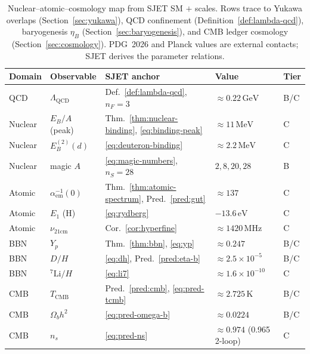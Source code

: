 \begin{table}[ht]
\centering
\small
\renewcommand{\arraystretch}{1.14}
\begin{tabular}{@{}lllll@{}}
\toprule
\textbf{Domain} & \textbf{Observable} & \textbf{SJET anchor} &
\textbf{Value} & \textbf{Tier} \\
\midrule
QCD &
  $\Lambda_{\mathrm{QCD}}$ &
  Def.~\ref{def:lambda-qcd}, $n_F=3$ &
  $\approx 0.22\,\mathrm{GeV}$ &
  B/C \\
Nuclear &
  $E_B/A$ (peak) &
  Thm.~\ref{thm:nuclear-binding}, \eqref{eq:binding-peak} &
  $\approx 11\,\mathrm{MeV}$ &
  C \\
Nuclear &
  $E_B^{(2)}(d)$ &
  \eqref{eq:deuteron-binding} &
  $\approx 2.2\,\mathrm{MeV}$ &
  C \\
Nuclear &
  magic $A$ &
  \eqref{eq:magic-numbers}, $n_S=28$ &
  $2,8,20,28$ &
  B \\
Atomic &
  $\alpha_{\mathrm{em}}^{-1}(0)$ &
  Thm.~\ref{thm:atomic-spectrum}, Pred.~\ref{pred:gut} &
  $\approx 137$ &
  C \\
Atomic &
  $E_1$ (H) &
  \eqref{eq:rydberg} &
  $-13.6\,\mathrm{eV}$ &
  C \\
Atomic &
  $\nu_{21\mathrm{cm}}$ &
  Cor.~\ref{cor:hyperfine} &
  $\approx 1420\,\mathrm{MHz}$ &
  C \\
BBN &
  $Y_p$ &
  Thm.~\ref{thm:bbn}, \eqref{eq:yp} &
  $\approx 0.247$ &
  B/C \\
BBN &
  $D/H$ &
  \eqref{eq:dh}, Pred.~\ref{pred:eta-b} &
  $\approx 2.5\times 10^{-5}$ &
  B/C \\
BBN &
  ${}^7\mathrm{Li}/H$ &
  \eqref{eq:li7} &
  $\approx 1.6\times 10^{-10}$ &
  C \\
CMB &
  $T_{\mathrm{CMB}}$ &
  Pred.~\ref{pred:cmb}, \eqref{eq:pred-tcmb} &
  $\approx 2.725\,\mathrm{K}$ &
  B/C \\
CMB &
  $\Omega_b h^2$ &
  \eqref{eq:pred-omega-b} &
  $\approx 0.0224$ &
  B/C \\
CMB &
  $n_s$ &
  \eqref{eq:pred-ns} &
  $\approx 0.974$ (0.965 2-loop) &
  C \\
\bottomrule
\end{tabular}
\caption{Nuclear--atomic--cosmology map from SJET SM $+$ scales. Rows trace
to Yukawa overlaps (Section~\ref{sec:yukawa}), QCD confinement
(Definition~\ref{def:lambda-qcd}), baryogenesis $\eta_B$
(Section~\ref{sec:baryogenesis}), and CMB ledger cosmology
(Section~\ref{sec:cosmology}). PDG~2026 and Planck values are external
contacts; SJET derives the parameter relations.}
\label{tab:nuclear-cosmo-map}
\end{table}

